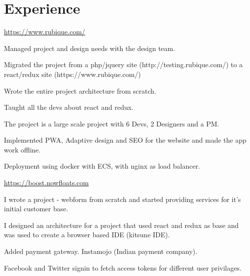 \documentclass[]{deedy-resume-openfont}
\begin{document}
\hfill
\begin{minipage}[t]{0.66\textwidth}


\section{Experience}


{ \url{ https://www.rubique.com/ } }\\
\vspace{\topsep} %
\begin{tightemize}
\item Managed project and design needs with the design team.
\item Migrated the project from a php/jquery site (http://testing.rubique.com/) to a react/redux site (https://www.rubique.com/)
\item Wrote the entire project architecture from scratch.
\item Taught all the devs about react and redux.
\item The project is a large scale project with 6 Devs, 2 Designers and a PM.
\item Implemented PWA, Adaptive design and SEO for the website and made the app work offline.
\item Deployment using docker with ECS, with nginx as load balancer.
\end{tightemize}
\sectionsep


{ \url{ https://boost.nowfloats.com } }\\
\begin{tightemize}
\item I wrote a project - webform from scratch and started providing services for it's initial customer base.
\item I designed an architecture for a project that used react and redux as base and was used to create a browser based IDE (kitsune IDE).
\item Added payment gateway. Instamojo (Indian payment company).
\item Facebook and Twitter signin to fetch access tokens for different user privilages.
\vspace{\topsep} %
\end{tightemize}


\end{minipage}
\end{document}
